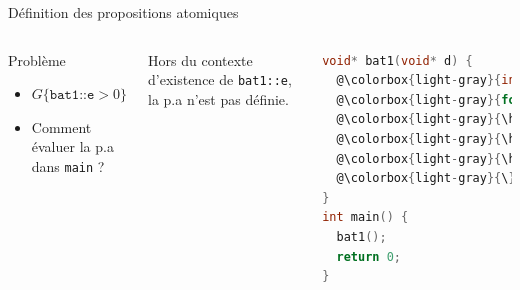 \documentclass{beamer}
\begin{document}
\begin{frame}[fragile]{Définition des propositions atomiques}
\begin{columns}[onlytextwidth, c]

  \begin{block}{Problème}
  \begin{itemize}
    \setlength{\itemsep}{1.5em}
    \item $G \{\texttt{bat1::e} > 0\}$
    \item Comment évaluer la p.a dans \texttt{main} ?
  \end{itemize}
  \end{block}

  \vspace{3em}
  \alert{Hors du contexte d'existence de \texttt{bat1::e}, la p.a n'est pas définie.}


\begin{lstlisting}[language=C]
void* bat1(void* d) {
  @\colorbox{light-gray}{int i, \textcolor{red}{e} = 100;}@
  @\colorbox{light-gray}{for (i=0; i<3; i++) \{}@
  @\colorbox{light-gray}{\hspace{2ex}while (\textcolor{red}{e} > 0)}@
  @\colorbox{light-gray}{\hspace{4ex}\textcolor{red}{e}-{}-;}@
  @\colorbox{light-gray}{\hspace{2ex}\textcolor{red}{e} = 100;}@
  @\colorbox{light-gray}{\}}@
}
int main() {
  bat1();
  return 0;
}
\end{lstlisting}
\end{columns}
\end{frame}
\end{document}

